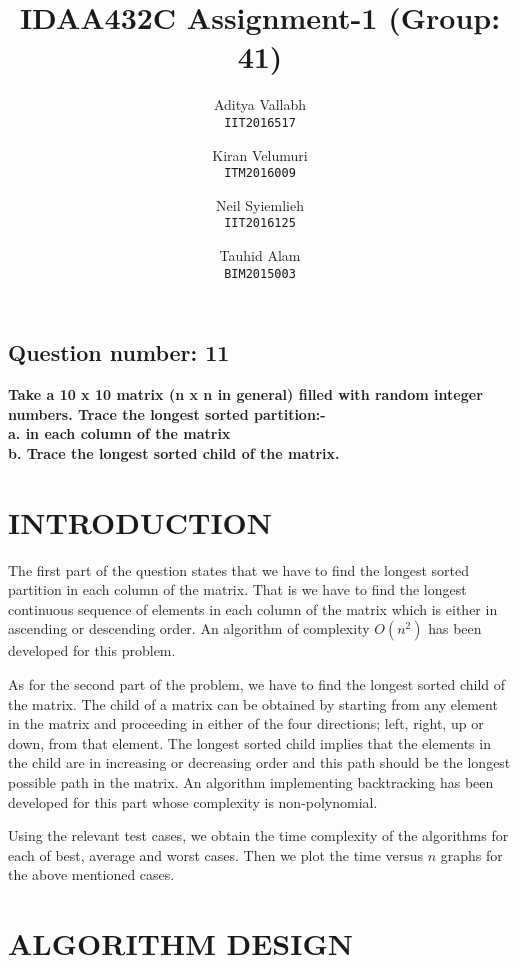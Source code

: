 \documentclass[letterpaper, 11 pt, conference]{ieeeconf}  %
\title{\LARGE 
IDAA432C Assignment-1 (Group: 41)
}
\author{
  Aditya Vallabh\\
  \texttt{IIT2016517}
  \and
  Kiran Velumuri\\
  \texttt{ITM2016009}
  \and
  Neil Syiemlieh\\
  \texttt{IIT2016125}
  \and
  Tauhid Alam\\
  \texttt{BIM2015003}
}
\begin{document}
\maketitle
\thispagestyle{empty}
\pagestyle{empty}



\subsection*{ \textbf{Question number: 11} }
\textbf{Take a 10 x 10 matrix (n x n in general) filled with random integer numbers. Trace the
longest sorted partition:-\\
a. in each column of the matrix\\
b. Trace the longest sorted child of the matrix.}


\section{INTRODUCTION}

The first part of the question states that we have to find the longest sorted partition in each column of the matrix. That is we have to find the longest continuous sequence of elements in each column of the matrix which is either in ascending or descending order. An algorithm of complexity $O(n^2)$ has been developed for this problem.

As for the second part of the problem, we have to find the longest sorted child of the matrix. The child of a matrix can be obtained by starting from any element in the matrix and proceeding in either of the four directions; left, right, up or down, from that element. The longest sorted child implies that the elements in the child are in increasing or decreasing order and this path should be the longest possible path in the matrix.  An algorithm implementing backtracking has been developed for this part whose complexity is non-polynomial.

Using the relevant test cases, we obtain the time complexity of the algorithms for each of best, average and worst cases. Then we plot the time versus $n$ graphs for the above mentioned cases.


\section{ALGORITHM DESIGN}
\end{document}
